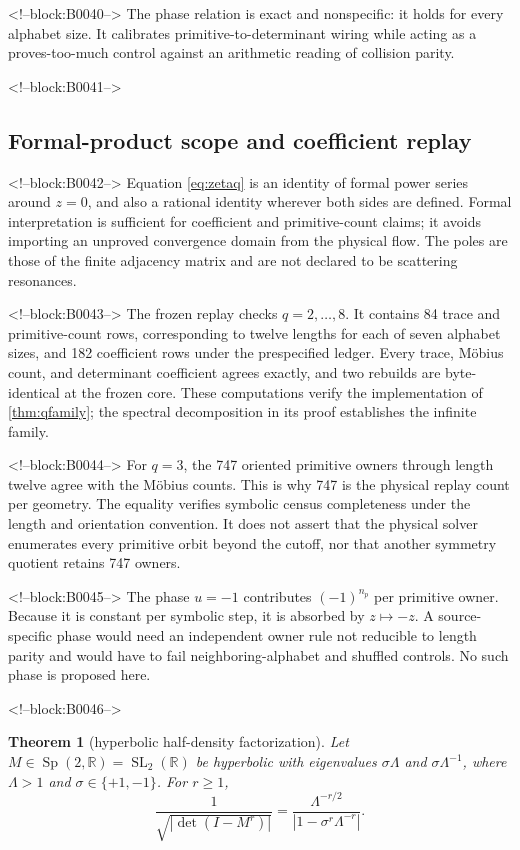 \documentclass[11pt,a4paper]{article}
\newtheorem{theorem}{Theorem}[section]
\theoremstyle{definition}
\theoremstyle{remark}
\newcommand{\SL}{\operatorname{SL}}
\begin{document}
<!--block:B0040-->
The phase relation is exact and nonspecific: it holds for every alphabet size. It calibrates primitive-to-determinant wiring while acting as a proves-too-much control against an arithmetic reading of collision parity.

<!--block:B0041-->
\subsection{Formal-product scope and coefficient replay}

<!--block:B0042-->
Equation \eqref{eq:zetaq} is an identity of formal power series around \(z=0\), and also a rational identity wherever both sides are defined. Formal interpretation is sufficient for coefficient and primitive-count claims; it avoids importing an unproved convergence domain from the physical flow. The poles are those of the finite adjacency matrix and are not declared to be scattering resonances.

<!--block:B0043-->
The frozen replay checks \(q=2,\ldots,8\). It contains 84 trace and primitive-count rows, corresponding to twelve lengths for each of seven alphabet sizes, and 182 coefficient rows under the prespecified ledger. Every trace, Möbius count, and determinant coefficient agrees exactly, and two rebuilds are byte-identical at the frozen core. These computations verify the implementation of \cref{thm:qfamily}; the spectral decomposition in its proof establishes the infinite family.

<!--block:B0044-->
For \(q=3\), the 747 oriented primitive owners through length twelve agree with the Möbius counts. This is why 747 is the physical replay count per geometry. The equality verifies symbolic census completeness under the length and orientation convention. It does not assert that the physical solver enumerates every primitive orbit beyond the cutoff, nor that another symmetry quotient retains 747 owners.

<!--block:B0045-->
The phase \(u=-1\) contributes \((-1)^{n_p}\) per primitive owner. Because it is constant per symbolic step, it is absorbed by \(z\mapsto-z\). A source-specific phase would need an independent owner rule not reducible to length parity and would have to fail neighboring-alphabet and shuffled controls. No such phase is proposed here.

<!--block:B0046-->
\begin{theorem}[hyperbolic half-density factorization]\label{thm:half}
Let \(M\in\operatorname{Sp}(2,\mathbb R)=\SL_2(\mathbb R)\) be hyperbolic with eigenvalues \(\sigma\Lambda\) and \(\sigma\Lambda^{-1}\), where \(\Lambda>1\) and \(\sigma\in\{+1,-1\}\). For \(r\ge1\),
\begin{equation}\label{eq:half}
 \frac{1}{\sqrt{|\det(I-M^r)|}}
 =\frac{\Lambda^{-r/2}}{|1-\sigma^r\Lambda^{-r}|}.
\end{equation}
\end{theorem}
\end{document}
